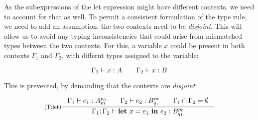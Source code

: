 As the subexpressions of the let expression might have different contexts, we need to account for that as well. To permit a consistent formulation of the type rule, we need to add an assumption: the two contexts need to be \emph{disjoint}. This will allow us to avoid any typing inconsistencies that could arise from mismatched types between the two contexts. 
For this, a variable \(x\) could be present in both contexts \(\Gamma_1\) and \(\Gamma_2\), with differnt types assigned to the variable:

\[
   \Gamma_1 \vdash x : A \qquad \Gamma_2 \vdash x : B
\]

This is prevented, by demanding that the contexts are \emph{disjoint}:

\[
   \inference[(T:let)]
   {\typing{\Gamma_1}{e_1}{\ratype{A}{p_0}{m}} \qquad \typing{\Gamma_2}{e_2}{\ratype{B}{m}{q_1}} \qquad \Gamma_1 \cap \Gamma_2 = \emptyset}
   {\typing{\Gamma_1; \Gamma_2}{\letexp{x}{e_1}{e_2}}{\ratype{B}{p_0}{q_1}}}
\]


















